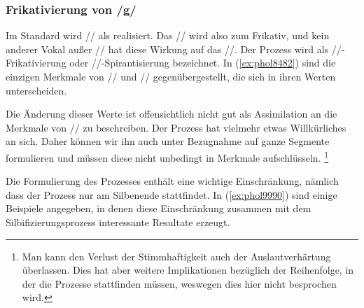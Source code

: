 \begin{exe}
  \ex\label{ex:phol8011}
  \begin{xlist}
  \end{xlist}
\end{exe}

\subsubsection{Frikativierung von /g/}

\label{sec:prozgfrik}

Im Standard wird // als \textipa{[I\c{c}.]} realisiert.
Das // wird also zum Frikativ, und kein anderer Vokal außer // hat diese Wirkung auf das //.
Der Prozess wird als //-Frikativierung oder //-Spirantisierung bezeichnet.
In (\ref{ex:phol8482}) sind die einzigen Merkmale von // und // gegenübergestellt, die sich in ihren Werten unterscheiden.

\begin{exe}
  \ex\label{ex:phol8482}
  \begin{xlist}
  \end{xlist}
\end{exe}

Die Änderung dieser Werte ist offensichtlich nicht gut als Assimilation an die Merkmale von // zu beschreiben.
Der Prozess hat vielmehr etwas Willkürliches an sich.
Daher können wir ihn auch unter Bezugnahme auf ganze Segmente formulieren und müssen diese nicht unbedingt in Merkmale aufschlüsseln.%
\footnote{Man kann den Verlust der Stimmhaftigkeit auch der Auslautverhärtung überlassen.
Dies hat aber weitere Implikationen bezüglich der Reihenfolge, in der die Prozesse stattfinden müssen, weswegen dies hier nicht besprochen wird.}


Die Formulierung des Prozesses enthält eine wichtige Einschränkung, nämlich dass der Prozess nur am Silbenende stattfindet.
In (\ref{ex:phol9990}) sind einige Beispiele angegeben, in denen diese Einschränkung zusammen mit dem Silbifizierungsprozess interessante Resultate erzeugt.


